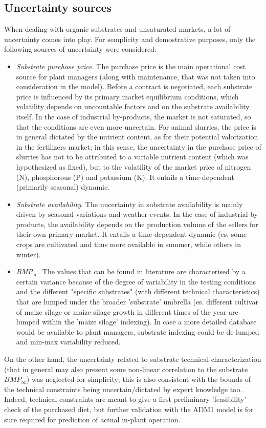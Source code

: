 \subsection{Uncertainty sources}
When dealing with organic substrates and unsaturated markets, a lot of uncertainty comes into play.
For semplicity and demostrative purposes, only the following sources of uncertainty were considered:
\begin{itemize}
\item \emph{Substrate purchase price}. The purchase price is the main operational cost source for plant managers (along with maintenance, that was not taken into consideration in the model). Before a contract is negotiated, each substrate price is influenced by its primary market equilibrium conditions, which volatility depends on uncountable factors and on the substrate availability itself. In the case of industrial by-products, the market is not saturated, so that the conditions are even more uncertain. For animal slurries, the price is in general dictated by the nutrient content, as for their potential valorization in the fertilizers market; in this sense, the uncertainty in the purchase price of slurries has not to be attributed to a variable nutrient content (which was hypothesized as fixed), but to the volatility of the market price of nitrogen (N), phosphorous (P) and potassium (K). It entails a time-dependent (primarily seasonal) dynamic.

\item \emph{Substrate availability}. The uncertainty in substrate availability is mainly driven by seasonal variations and weather events. In the case of industrial by-products, the availability depends on the production volume of the sellers for their own primary market. It entails a time-dependent dynamic (es. some crops are cultivated and thus more available in summer, while others in winter).

\item \emph{BMP$_{\infty}$}. The values that can be found in literature are characterised by a certain variance because of the degree of variability in the testing conditions and the different "specific substrates" (with different technical characteristics) that are lumped under the broader 'substrate' umbrella (es. different cultivar of maize silage or maize silage growth in different times of the year are lumped within the 'maize silage' indexing). In case a more detailed database would be available to plant managers, substrate indexing could be de-lumped and min-max variability reduced.
\end{itemize}

On the other hand, the uncertainty related to substrate technical characterization (that in general may also present some non-linear correlation to the substrate $BMP_{\infty}$) was neglected for simplicity; this is also consistent with the bounds of the technical constraints being uncertain/dictated by expert knowledge too. Indeed, technical constraints are meant to give a first preliminary 'feasibility' check of the purchased diet, but further validation with the ADM1 model is for sure required for prediction of actual in-plant operation. 
